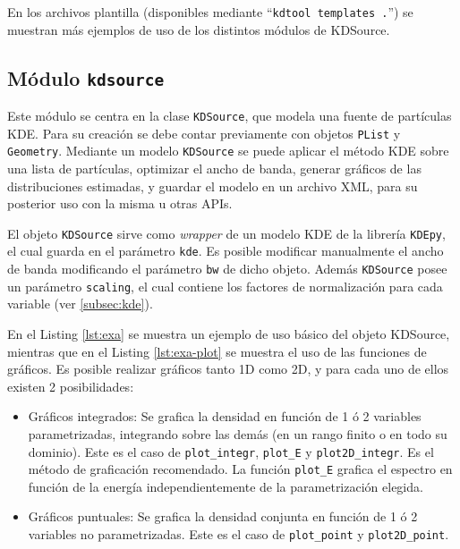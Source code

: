 En los archivos plantilla (disponibles mediante ``\verb|kdtool templates .|'') se muestran más ejemplos de uso de los distintos módulos de KDSource.


\subsection{Módulo \texttt{kdsource}}

Este módulo se centra en la clase \verb|KDSource|, que modela una fuente de partículas KDE. Para su creación se debe contar previamente con objetos \verb|PList| y \verb|Geometry|. Mediante un modelo \verb|KDSource| se puede aplicar el método KDE sobre una lista de partículas, optimizar el ancho de banda, generar gráficos de las distribuciones estimadas, y guardar el modelo en un archivo XML, para su posterior uso con la misma u otras APIs.

El objeto \verb|KDSource| sirve como \emph{wrapper} de un modelo KDE de la librería \verb|KDEpy|, el cual guarda en el parámetro \verb|kde|. Es posible modificar manualmente el ancho de banda modificando el parámetro \verb|bw| de dicho objeto. Además \verb|KDSource| posee un parámetro \verb|scaling|, el cual contiene los factores de normalización para cada variable (ver \ref{subsec:kde}).

En el Listing \ref{lst:exa} se muestra un ejemplo de uso básico del objeto KDSource, mientras que en el Listing \ref{lst:exa-plot} se muestra el uso de las funciones de gráficos. Es posible realizar gráficos tanto 1D como 2D, y para cada uno de ellos existen 2 posibilidades:
\begin{itemize}
	\item Gráficos integrados: Se grafica la densidad en función de 1 ó 2 variables parametrizadas, integrando sobre las demás (en un rango finito o en todo su dominio). Este es el caso de \verb|plot_integr|, \verb|plot_E| y \verb|plot2D_integr|. Es el método de graficación recomendado. La función \verb|plot_E| grafica el espectro en función de la energía independientemente de la parametrización elegida. 
	\item Gráficos puntuales: Se grafica la densidad conjunta en función de 1 ó 2 variables no parametrizadas. Este es el caso de \verb|plot_point| y \verb|plot2D_point|.
\end{itemize}

